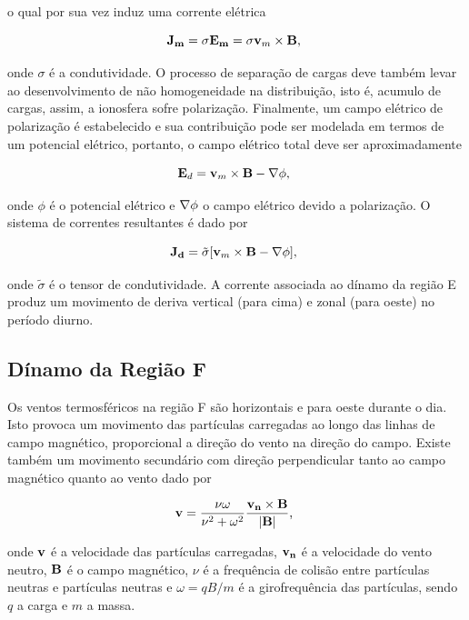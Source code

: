 o qual por sua vez induz uma corrente elétrica

\begin{equation}
{\bf J_m}=\sigma{\bf E_m} = \sigma{\bf v}_m\times{\bf B}\mbox{,}~
\end{equation}

onde $\sigma$ é a condutividade. O processo de separação de cargas deve também levar ao desenvolvimento de não homogeneidade na distribuição, isto é, acumulo de cargas, assim, a ionosfera sofre polarização. Finalmente, um campo elétrico de polarização é estabelecido e sua contribuição pode ser modelada em termos de um potencial elétrico, portanto, o campo elétrico total deve ser aproximadamente

\begin{equation}
{\bf E}_d = {\bf v}_m\times{\bf B}-{\bf \nabla}\phi\mbox{,}~
\end{equation}

onde $\phi$ é o potencial elétrico e ${\bf \nabla}\phi$ o campo elétrico devido a polarização. O sistema de correntes resultantes é dado por

\begin{equation}
{\bf J_d}=\tilde{\sigma}[{\bf v}_m\times{\bf B}-{\bf \nabla}\phi]\mbox{,}~
\end{equation}

onde $\tilde{\sigma}$ é o tensor de condutividade. A corrente associada ao dínamo da região E produz um movimento de deriva vertical (para cima) e zonal (para oeste) no período diurno.

\subsection{Dínamo da Região F}

Os ventos termosféricos na região F são horizontais e para oeste durante o dia. Isto provoca um movimento das partículas carregadas ao longo das linhas de campo magnético, proporcional a direção do vento na direção do campo. Existe também um movimento secundário com direção perpendicular tanto ao campo magnético quanto ao vento \cite{BATISTA:1986} dado por

\begin{equation}
{\bf v}=\frac{\nu\omega}{\nu^2+\omega^2}\frac{{\bf v_n}\times{\bf B}}{|{\bf B}|}\mbox{,}~
\end{equation}

onde ${\bf v}$ é a velocidade das partículas carregadas, ${\bf v_n}$ é a velocidade do vento neutro, ${\bf B}$ é o campo magnético, $\nu$ é a frequência de colisão entre partículas neutras e partículas neutras e $\omega={qB/m}$ é a girofrequência das partículas, sendo $q$ a carga e $m$ a massa.


